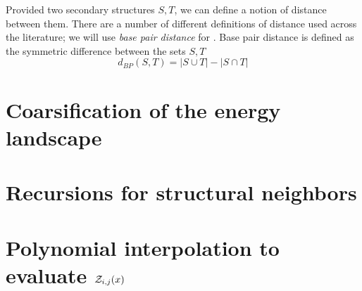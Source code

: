 Provided two secondary structures $S,T$, we can define a notion of
distance between them. There are a number of different definitions of distance
used across the literature; we will use {\em base pair distance} for \FFTbor.
Base pair distance is defined as the symmetric difference between the sets
$S,T$
\begin{equation}
d_{BP}(S,T) = |S \cup T| - |S \cap T|
\end{equation}

\section{Coarsification of the energy landscape}

\section{Recursions for structural neighbors}

\section{Polynomial interpolation to evaluate $\mathcal{Z}_{i,j}(x)$}

